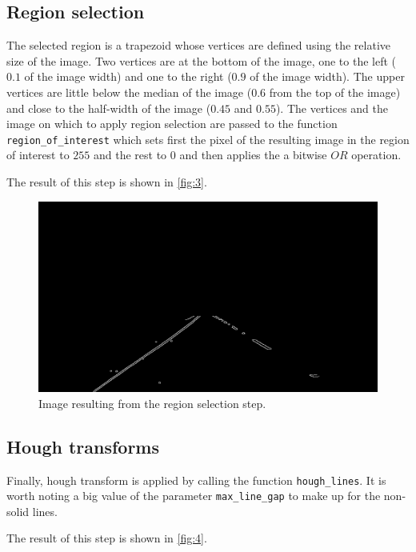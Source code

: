 \documentclass{article}
\let\cd\lstinline
\begin{document}
\subsection{Region selection}
The selected region is a trapezoid whose vertices are defined using the relative size of the image. Two vertices are at the bottom of the image, one to the left ($0.1$ of the image width) and one to the right ($0.9$ of the image width). The upper vertices are little below the median of the image ($0.6$ from the top of the image) and close to the half-width of the image ($0.45$ and $0.55$). The vertices and the image on which to apply region selection are passed to the function \cd+region_of_interest+ which sets first the pixel of the resulting image in the region of interest to $255$ and the rest to $0$ and then applies the a bitwise $OR$ operation.

The result of this step is shown in \autoref{fig:3}.
\begin{figure}
\centering
\includegraphics[scale=0.4]{lane_detection_steps/solidYellowCurve/3.jpg}
\caption{Image resulting from the region selection step.}
\label{fig:3}
\end{figure}

\subsection{Hough transforms}
Finally, hough transform is applied by calling the function \cd+hough_lines+. It is worth noting a big value of the parameter \cd+max_line_gap+ to make up for the non-solid lines.

The result of this step is shown in \autoref{fig:4}.
\end{document}
